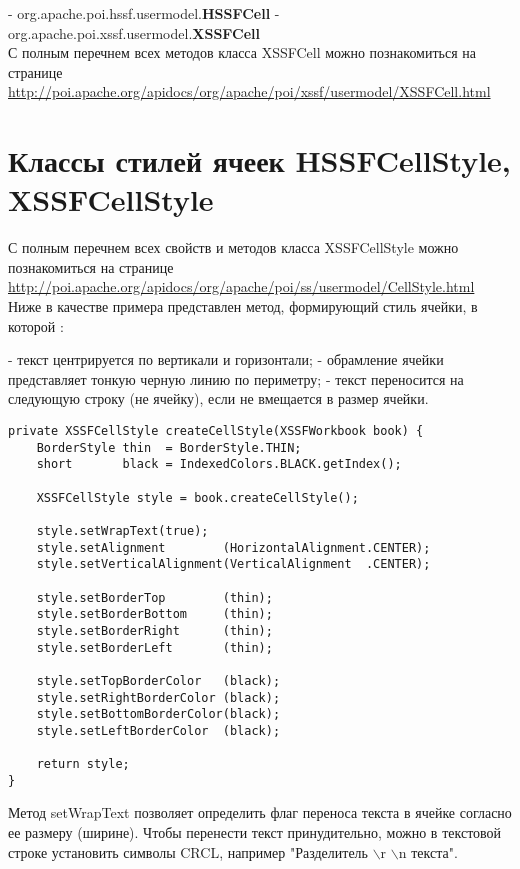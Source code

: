 -   org.apache.poi.hssf.usermodel.\textbf{HSSFCell}
-   org.apache.poi.xssf.usermodel.\textbf{XSSFCell}
\\
С полным перечнем всех методов класса XSSFCell можно познакомиться на странице \\ \href{http://poi.apache.org/apidocs/org/apache/poi/xssf/usermodel/XSSFCell.html}{http://poi.apache.org/apidocs/org/apache/poi/xssf/usermodel/XSSFCell.html}



\section{Классы стилей ячеек HSSFCellStyle, XSSFCellStyle}

С полным перечнем всех свойств и методов класса XSSFCellStyle можно познакомиться на странице \\
\href{http://poi.apache.org/apidocs/org/apache/poi/ss/usermodel/CellStyle.html}{http://poi.apache.org/apidocs/org/apache/poi/ss/usermodel/CellStyle.html} \\
Ниже в качестве примера представлен метод, формирующий стиль ячейки, в которой :

-   текст центрируется по вертикали и горизонтали;
-   обрамление ячейки представляет тонкую черную линию по периметру;
-   текст переносится на следующую строку (не ячейку), если не вмещается в размер ячейки.

\begin{lstlisting}
private XSSFCellStyle createCellStyle(XSSFWorkbook book) {
	BorderStyle thin  = BorderStyle.THIN;
	short       black = IndexedColors.BLACK.getIndex();

	XSSFCellStyle style = book.createCellStyle();

	style.setWrapText(true);
	style.setAlignment        (HorizontalAlignment.CENTER);
	style.setVerticalAlignment(VerticalAlignment  .CENTER);
	
	style.setBorderTop        (thin);
	style.setBorderBottom     (thin);
	style.setBorderRight      (thin);
	style.setBorderLeft       (thin);
	
	style.setTopBorderColor   (black);
	style.setRightBorderColor (black);
	style.setBottomBorderColor(black);
	style.setLeftBorderColor  (black);
	
	return style;
}
\end{lstlisting}

Метод setWrapText позволяет определить флаг переноса текста в ячейке согласно ее размеру (ширине). Чтобы перенести текст принудительно, можно в текстовой строке установить символы CRCL, например "Разделитель $\backslash$r $\backslash$n текста".

